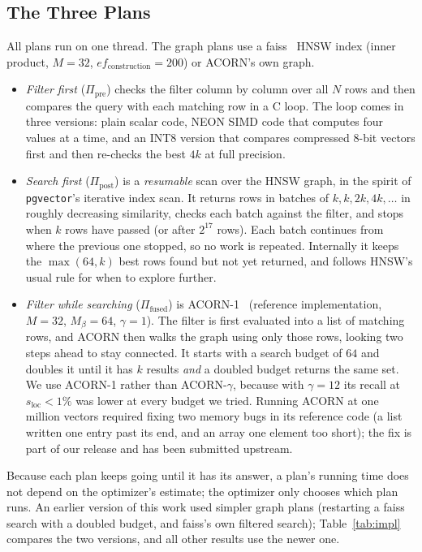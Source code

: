 \documentclass[sigconf,nonacm]{acmart}
\newcommand{\sloc}{s_{\text{loc}}}
\newcommand{\Ppre}{\Pi_{\text{pre}}}
\newcommand{\Pfus}{\Pi_{\text{fused}}}
\newcommand{\Ppost}{\Pi_{\text{post}}}
\begin{document}
\subsection{The Three Plans}\label{sec:plans}
All plans run on one thread. The graph plans use a faiss~\cite{douze2024faiss} HNSW index (inner product, $M=32$, $ef_{\text{construction}}=200$) or ACORN's own graph.
\begin{itemize}
    \item \emph{Filter first} ($\Ppre$) checks the filter column by column over all $N$ rows and then compares the query with each matching row in a C loop. The loop comes in three versions: plain scalar code, NEON SIMD code that computes four values at a time, and an INT8 version that compares compressed 8-bit vectors first and then re-checks the best $4k$ at full precision.
    \item \emph{Search first} ($\Ppost$) is a \emph{resumable} scan over the HNSW graph, in the spirit of \texttt{pgvector}'s iterative index scan. It returns rows in batches of $k, k, 2k, 4k, \ldots$ in roughly decreasing similarity, checks each batch against the filter, and stops when $k$ rows have passed (or after $2^{17}$ rows). Each batch continues from where the previous one stopped, so no work is repeated. Internally it keeps the $\max(64,k)$ best rows found but not yet returned, and follows HNSW's usual rule for when to explore further.
    \item \emph{Filter while searching} ($\Pfus$) is ACORN-1~\cite{patel2024acorn} (reference implementation, $M=32$, $M_\beta=64$, $\gamma=1$). The filter is first evaluated into a list of matching rows, and ACORN then walks the graph using only those rows, looking two steps ahead to stay connected. It starts with a search budget of $64$ and doubles it until it has $k$ results \emph{and} a doubled budget returns the same set. We use ACORN-1 rather than ACORN-$\gamma$, because with $\gamma=12$ its recall at $\sloc<1\%$ was lower at every budget we tried. Running ACORN at one million vectors required fixing two memory bugs in its reference code (a list written one entry past its end, and an array one element too short); the fix is part of our release and has been submitted upstream.
\end{itemize}
Because each plan keeps going until it has its answer, a plan's running time does not depend on the optimizer's estimate; the optimizer only chooses which plan runs. An earlier version of this work used simpler graph plans (restarting a faiss search with a doubled budget, and faiss's own filtered search); Table~\ref{tab:impl} compares the two versions, and all other results use the newer one.
\end{document}
